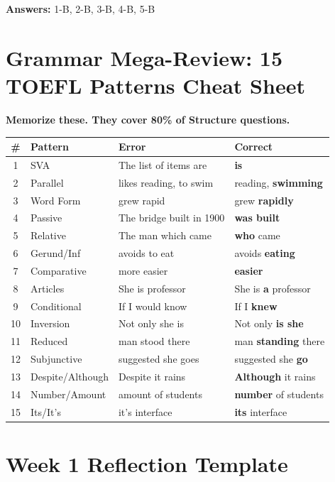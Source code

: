 \documentclass[10pt,a4paper]{article}
\begin{document}
\textbf{Answers:} 1-B, 2-B, 3-B, 4-B, 5-B

\section*{Grammar Mega-Review: 15 TOEFL Patterns Cheat Sheet}

\textbf{Memorize these. They cover 80\% of Structure questions.}

\begin{center}
\small
\begin{tabular}{clll}
\toprule
\# & \textbf{Pattern} & \textbf{Error} & \textbf{Correct} \\
\midrule
1 & SVA & The list of items are & \textbf{is} \\
2 & Parallel & likes reading, to swim & reading, \textbf{swimming} \\
3 & Word Form & grew rapid & grew \textbf{rapidly} \\
4 & Passive & The bridge built in 1900 & \textbf{was built} \\
5 & Relative & The man which came & \textbf{who} came \\
6 & Gerund/Inf & avoids to eat & avoids \textbf{eating} \\
7 & Comparative & more easier & \textbf{easier} \\
8 & Articles & She is professor & She is \textbf{a} professor \\
9 & Conditional & If I would know & If I \textbf{knew} \\
10 & Inversion & Not only she is & Not only \textbf{is she} \\
11 & Reduced & man stood there & man \textbf{standing} there \\
12 & Subjunctive & suggested she goes & suggested she \textbf{go} \\
13 & Despite/Although & Despite it rains & \textbf{Although} it rains \\
14 & Number/Amount & amount of students & \textbf{number} of students \\
15 & Its/It's & it's interface & \textbf{its} interface \\
\bottomrule
\end{tabular}
\end{center}

\section*{Week 1 Reflection Template}
\end{document}
